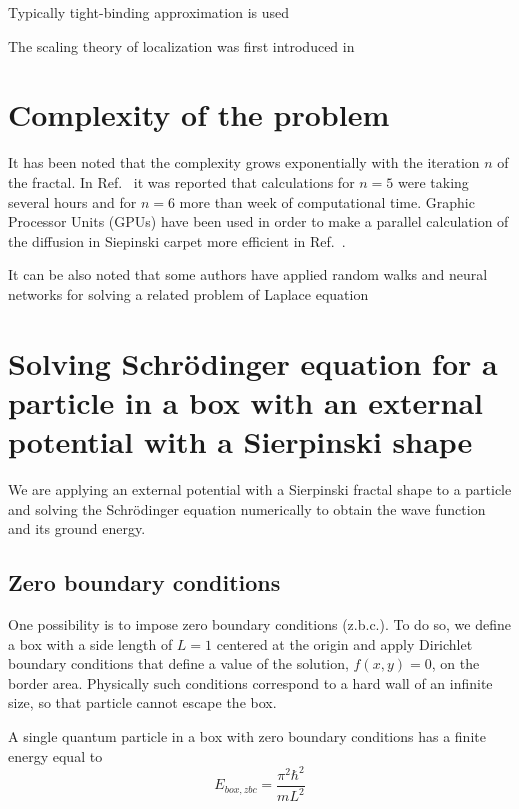 \documentclass[aps,prl,reprint,onecolumn,superscriptaddress,floatfix,longbibliography]{revtex4-2}
\begin{document}
Typically tight-binding approximation is 
used\cite{vanVeen2016,Kempkes2018,xu2020shining,Fremling2020}

The scaling theory of localization was first introduced in \cite{Abrahams1979}

\section{Complexity of the problem}

It has been noted that the complexity grows exponentially with the iteration $n$ of the fractal. 
In Ref.~\cite{Li2011} it was reported that calculations for $n=5$ were taking several hours and for $n=6$ more than week of computational time.
Graphic Processor Units (GPUs) have been used in order to make a parallel calculation of the diffusion in Siepinski carpet more efficient in Ref.~\cite{Hoffmann2010}.

It can be also noted that some authors have applied random walks\cite{Janaswamy2007,Kolluru2008} and neural networks for solving a related problem of Laplace equation

\break  
\section{Solving Schrödinger equation for a particle in a box with an external potential with a Sierpinski shape}

We are applying an external potential with a Sierpinski fractal shape to a particle and solving the Schrödinger equation numerically to obtain the wave function and its ground energy.

\subsection{Zero boundary conditions}

One possibility is to impose zero boundary conditions (z.b.c.). 
To do so, we define a box with a side length of $L=1$ centered at the origin and apply Dirichlet boundary conditions that define a value of the solution, $f(x,y)=0$, on the border area. 
Physically such conditions correspond to a hard wall of an infinite size, so that particle cannot escape the box.

A single quantum particle in a box with zero boundary conditions has a finite energy equal to 
\begin{equation}
E_{box,zbc} = \frac{\pi^2\hbar^2}{mL^2}
\label{Eq:E:zbc}
\end{equation}
\end{document}
